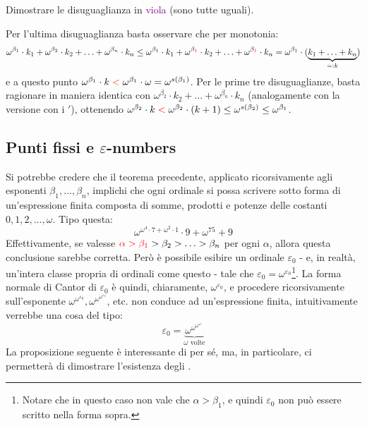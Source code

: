 \begin{exercise}
	Dimostrare le disuguaglianza in \textcolor{purple}{viola} (sono tutte uguali).
\end{exercise}

\begin{soln}
	Per l'ultima disuguaglianza basta osservare che per monotonia:
	\[ \omega^{\beta_1} \cdot k_1 + \omega^{\beta_2} \cdot k_2 + \ldots + \omega^{\beta_n} \cdot k_n \leq \omega^{\beta_1} \cdot k_1 + \omega^{\beta_{\textcolor{red}1}} \cdot k_2 + \ldots + \omega^{\beta_{\textcolor{red}1}} \cdot k_n = \omega^{\beta_1} \cdot (\underbrace{k_1 + \ldots + k_n}_{=: k})
		\]
	e a questo punto $\omega^{\beta_1} \cdot k \;\textcolor{red}{<}\; \omega^{\beta_1} \cdot \omega = \omega^{s(\beta_1)}$. Per le prime tre disuguaglianze, basta ragionare in maniera identica con $\omega^{\beta_2} \cdot k_2 + \ldots + \omega^{\beta_n} \cdot k_n$ (analogamente con la versione con i $'$), ottenendo
	$\omega^{\beta_2} \cdot k \;\textcolor{red}{<}\; \omega^{\beta_2} \cdot (k + 1) \leq \omega^{s(\beta_2)} \leq \omega^{\beta_1}$.
\end{soln}

\subsection{Punti fissi e \texorpdfstring{$\varepsilon$}{epsilon}-numbers}
Si potrebbe credere che il teorema precedente, applicato ricorsivamente agli esponenti $\beta_1,\ldots,\beta_n$, implichi che ogni ordinale
si possa scrivere sotto forma di un'espressione finita composta di somme, prodotti e potenze delle costanti $0,1,2,\ldots,\omega$. Tipo questa:
\[ \omega^{\omega^4 \cdot 7 + \omega^2 \cdot 1}\cdot 9 + \omega^{75} + 9
	\]
Effettivamente, se valesse $\textcolor{red}{\alpha > \beta_1}>\beta_2>\ldots>\beta_n$ per ogni $\alpha$, allora questa conclusione sarebbe corretta.
Per\`o \`e possibile esibire un ordinale $\varepsilon_0$ - e, in realt\`a, un'intera classe propria di ordinali come questo - tale che $\varepsilon_0 = \omega^{\varepsilon_0}$\footnote{Notare che in questo caso non vale che $\alpha > \beta_1$, e quindi $\varepsilon_0$ non pu\`o essere scritto nella forma sopra.}.
La forma normale di Cantor di $\varepsilon_0$ \`e quindi, chiaramente, $\omega^{\varepsilon_0}$, e procedere ricorsivamente sull'esponente $\omega^{\omega^{\varepsilon_0}},\omega^{\omega^{\omega^{\varepsilon_0}}}$, etc. non conduce ad un'espressione finita, intuitivamente verrebbe una cosa del tipo:
\[ \varepsilon_0 = \underbrace{\omega^{\omega^{\omega^{\omega^{\iddots}}}}}_{\text{$\omega$ volte}}
	\]
La proposizione seguente \`e interessante di per s\'e, ma, in particolare, ci permetter\`a di dimostrare l'esistenza degli .

